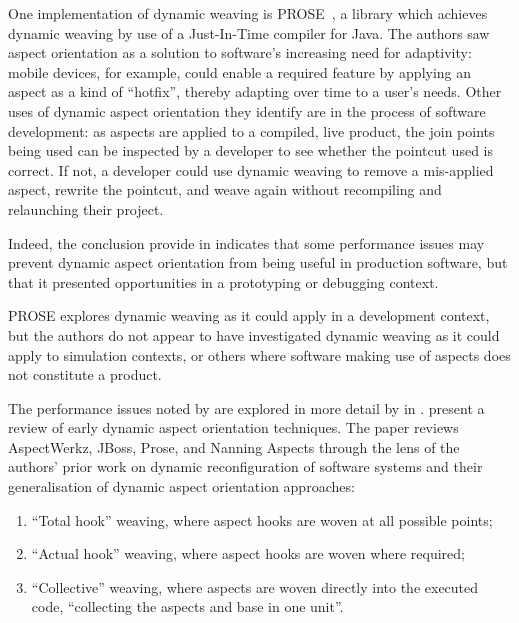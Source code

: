 One implementation of dynamic weaving is
PROSE~\cite{popovici2002PROSE,popovici2003JITaspects}, a library which achieves
dynamic weaving by use of a Just-In-Time compiler for Java. The authors saw
aspect orientation as a solution to software's increasing need for adaptivity:
mobile devices, for example, could enable a required feature by applying an
aspect as a kind of ``hotfix'', thereby adapting over time to a user's needs.
Other uses of dynamic aspect orientation they identify are in the process of
software development: as aspects are applied to a compiled, live product, the
join points being used can be inspected by a developer to see whether the
pointcut used is correct. If not, a developer could use dynamic weaving to
remove a mis-applied aspect, rewrite the pointcut, and weave again without
recompiling and relaunching their project.

Indeed, the conclusion \citeauthor{popovici2003JITaspects} provide in
\cite{popovici2003JITaspects} indicates that some performance issues 
may prevent
dynamic aspect orientation from being useful in production software, but that
it presented opportunities in a prototyping or debugging context.

PROSE explores dynamic weaving as it could apply in a development context, but
the authors do not appear to have investigated dynamic weaving as it could apply
to simulation contexts, or others where software making use of aspects does not
constitute a product.


The performance issues noted by \citeauthor{popovici2003JITaspects} are explored
in more detail by \citeauthor{dynamicAOchitchyan} in \cite{dynamicAOchitchyan}.
\citeauthor{dynamicAOchitchyan} present a review of early dynamic aspect orientation
techniques. The paper reviews AspectWerkz, JBoss, Prose, and Nanning Aspects
through the lens of the authors' prior work on dynamic reconfiguration of
software systems and their generalisation of dynamic aspect orientation
approaches: 

\begin{enumerate}
\item ``Total hook'' weaving, where aspect hooks are woven at all possible
points; 
\item ``Actual hook'' weaving, where aspect hooks are woven where required;
\item ``Collective'' weaving, where aspects are woven directly into the executed
code, ``collecting the aspects and base in one unit''. 
\end{enumerate}

